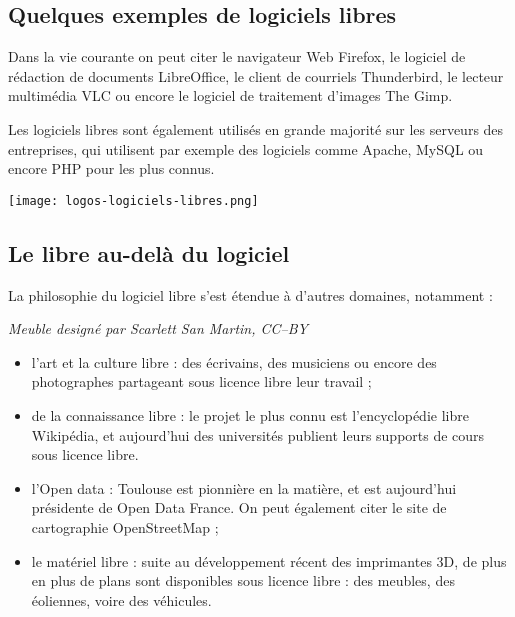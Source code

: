 \subsection{Quelques exemples de logiciels libres}

\begin{minipage}{0.7\textwidth}
Dans la vie courante on peut citer le navigateur Web \textcolor{Cdl}{Firefox}, 
le logiciel de rédaction de documents \textcolor{Cdl}{LibreOffice}, le 
client de courriels \textcolor{Cdl}{Thunderbird}, le lecteur 
multimédia \textcolor{Cdl}{VLC} ou encore le logiciel de traitement 
d’images \textcolor{Cdl}{The Gimp}.

\Separateur

Les logiciels libres sont également utilisés en grande majorité sur 
les serveurs des entreprises, qui utilisent par exemple des 
logiciels comme \textcolor{Cdl}{Apache}, \textcolor{Cdl}{MySQL} ou 
encore \textcolor{Cdl}{PHP} pour les plus connus.
\end{minipage}
\begin{minipage}{0.3\textwidth}
\begin{center}
\texttt{[image: logos-logiciels-libres.png]}
\end{center}
\end{minipage}

\subsection{Le libre au-delà du logiciel}

La philosophie du logiciel libre s’est étendue à d’autres domaines,
 notamment :

\begin{minipage}{0.3\textwidth}
\begin{center}
\textit{Meuble designé par Scarlett San Martin, CC--BY}
\end{center}
\end{minipage}
\begin{minipage}{0.7\textwidth}
\begin{itemize}[label=$\bullet$]
\item l'\textcolor{Cdl}{art} et la \textcolor{Cdl}{culture libre} : 
des écrivains, des musiciens 
ou encore des photographes partageant sous licence libre leur travail ;
\item de la \textcolor{Cdl}{connaissance libre} : le projet le plus connu est 
l’encyclopédie libre Wikipédia, et aujourd'hui des universités 
publient leurs supports de cours sous licence libre. 
\item l'\textcolor{Cdl}{Open data} : Toulouse est pionnière en la matière, 
et est aujourd'hui présidente de Open Data France. On peut également 
citer le site de cartographie \mbox{OpenStreetMap} ;
\item le \textcolor{Cdl}{matériel libre} : suite au développement 
récent des imprimantes 3D, de plus en plus de plans sont disponibles
 sous licence libre : des meubles, des éoliennes, voire des véhicules.
\end{itemize}
\end{minipage}


